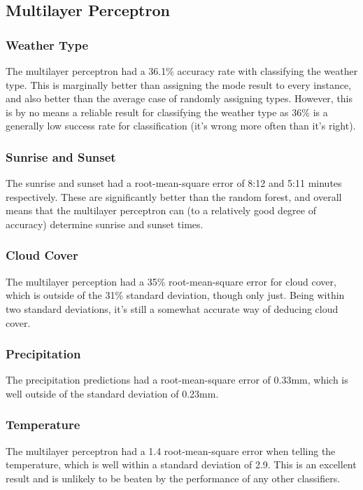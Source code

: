 \documentclass[a4paper,12pt,twoside]{report}
\begin{document}
\subsection{Multilayer Perceptron}

\subsubsection{Weather Type}
The multilayer perceptron had a 36.1\% accuracy rate with classifying the weather type. This is marginally better than assigning the mode result to every instance, and also better than the average case of randomly assigning types. However, this is by no means a reliable result for classifying the weather type as 36\% is a generally low success rate for classification (it's wrong more often than it's right). 

\subsubsection{Sunrise and Sunset}
The sunrise and sunset had a root-mean-square error of 8:12 and 5:11 minutes respectively. These are significantly better than the random forest, and overall means that the multilayer perceptron can (to a relatively good degree of accuracy) determine sunrise and sunset times.

\subsubsection{Cloud Cover}
The multilayer perception had a 35\% root-mean-square error for cloud cover, which is outside of the 31\% standard deviation, though only just. Being within two standard deviations, it's still a somewhat accurate way of deducing cloud cover.

\subsubsection{Precipitation}
The precipitation predictions had a root-mean-square error of 0.33mm, which is well outside of the standard deviation of 0.23mm. 

\subsubsection{Temperature}
The multilayer perceptron had a 1.4\celsius{} root-mean-square error when telling the temperature, which is well within a standard deviation of 2.9\celsius. This is an excellent result and is unlikely to be beaten by the performance of any other classifiers.
\end{document}
